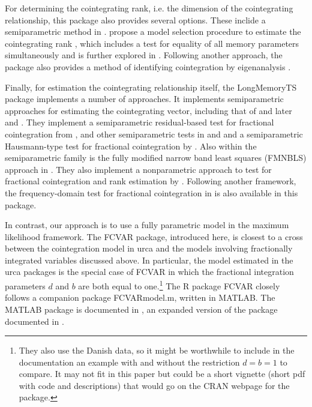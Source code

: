 \documentclass[11pt,letterpaper]{paper}
\newcommand{\pkg}[1]{{\normalfont\fontseries{b}\selectfont #1}}
\let\proglang=\textsf
\begin{document}
For determining the cointegrating rank, i.e. the dimension of the cointegrating relationship, this package also provides several options. 
These inclide a semiparametric method in \citet{ChenHurvich2003}. 
\citet{RobinsonYajima2002} propose a model selection procedure to estimate the cointegrating rank ,
which includes a test for equality of all memory parameters simultaneously and is further explored in \citet{NielsenShimotsu2007}. 
Following another approach, the package also provides a method of
identifying cointegration by eigenanalysis \citep{ZhangRobinsonYao2018}. 


Finally, for estimation the cointegrating relationship itself, the \pkg{LongMemoryTS} package implements a number of approaches. 
It implements semiparametric approaches for estimating the cointegrating vector, including that of 
\citet{Robinson1994} and later \citet{RobinsonMarinucci2003} and \citet{ChristensenNielsen2006}. 
They implement a semiparametric residual-based test for fractional cointegration from \citet{ChenHurvich2006}, 
and other semiparametric tests in \citet{MarmolVelasco2004}and \citet{WangWangChan2015}
and a semiparametric Hausmann-type test for fractional cointegration by \citet{Robinson2008}. 
Also within the semiparametric family is the fully modified narrow band least squares (FMNBLS) approach in  \citet{NielsenFrederiksen2011}. 
% 
They also implement a nonparametric approach to test for fractional cointegration and rank estimation by \citet{Nielsen2010}.
Following another framework, the frequency-domain test for fractional cointegration in \citet{SouzaEtal2018} is also available in this package. 

In contrast, our approach is to use a fully parametric model in the maximum likelihood framework. 
The \pkg{FCVAR} package, introduced here, is closest to a cross between the \citet{Johansen1995} cointegration model in \pkg{urca} and the models involving fractionally integrated variables discussed above. 
In particular, the model estimated in the \pkg{urca} packages is the special case of \pkg{FCVAR} in which the fractional integration parameters $d$ and $b$ are both equal to one.\footnote{They also use the Danish data, so it might be worthwhile to include in the documentation an example with and without the restriction $d = b = 1$ to compare. It may not fit in this paper but could be a short vignette (short pdf with code and descriptions) that would go on the CRAN webpage for the package. } 
% 
% 
% 
The \proglang{R} package \pkg{FCVAR} closely follows a companion package \pkg{FCVARmodel.m}, written in \proglang{MATLAB}. 
The \proglang{MATLAB} package is documented in \cite{Nielsen2016}, an expanded version of the package documented in \cite{Nielsen2013}. 
\end{document}
